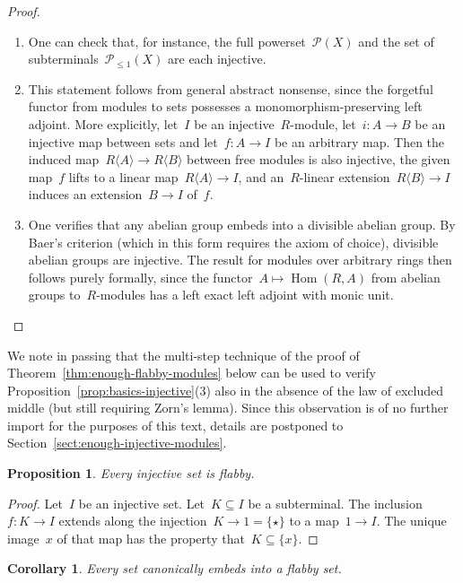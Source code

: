\documentclass[oneside]{amsart}
\theoremstyle{definition}
\theoremstyle{plain}
\newtheorem{prop}[defn]{Proposition}
\newtheorem{cor}[defn]{Corollary}
\theoremstyle{remark}
\renewcommand{\P}{\mathcal{P}}
\DeclareMathOperator{\Hom}{Hom}
\renewcommand{\_}{\mathpunct{.}\,}
\begin{document}
\begin{proof}\begin{enumerate}
\item One can check that, for instance, the full powerset~$\P(X)$ and the set of
subterminals~$\P_{\leq 1}(X)$ are each injective.
\item This statement follows from general abstract nonsense, since the forgetful functor from modules to sets possesses a monomorphism-preserving left
adjoint. More explicitly, let~$I$ be an injective~$R$-module, let~$i : A \to B$ be an injective map between sets and
let~$f : A \to I$ be an arbitrary map. Then the induced map~$R\langle A \rangle
\to R\langle B \rangle$ between free modules is also injective, the given
map~$f$ lifts to a linear map~$R\langle A \rangle \to I$, and an~$R$-linear
extension~$R\langle B \rangle \to I$ induces an extension~$B \to I$ of~$f$.
\item One verifies that any abelian group embeds into a divisible
abelian group. By Baer's criterion (which in this form requires the axiom of choice), divisible abelian groups are injective.
The result for modules over arbitrary rings then follows purely
formally, since the functor~$A \mapsto \Hom(R,A)$ from abelian groups
to~$R$-modules has a left exact left adjoint with monic unit. \qedhere
\end{enumerate}\end{proof}

We note in passing that the multi-step technique of the proof of
Theorem~\ref{thm:enough-flabby-modules} below can be used to verify
Proposition~\ref{prop:basics-injective}(3) also in the absence of the law of
excluded middle (but still requiring Zorn's lemma). Since this observation is of no
further import for the purposes of this text, details are postponed to
Section~\ref{sect:enough-injective-modules}.

\begin{prop}\label{prop:injective-flabby}
Every injective set is flabby.\end{prop}

\begin{proof}Let~$I$ be an injective set. Let~$K \subseteq I$ be a subterminal.
The inclusion~$f : K \to I$ extends along the injection~$K \to 1 = \{\star\}$
to a map~$1 \to I$. The unique image~$x$ of that map has the property that~$K
\subseteq \{x\}$.\end{proof}

\begin{cor}\label{cor:enough-flabby-sets}
Every set canonically embeds into a flabby set.\end{cor}
\end{document}
